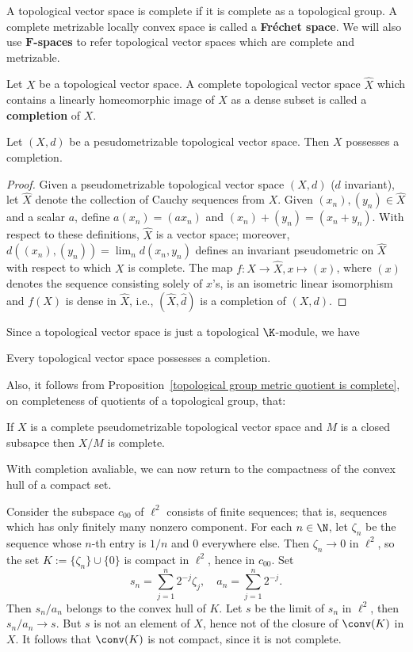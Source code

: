 A topological vector space is complete if it is complete as a topological group. A complete metrizable locally convex space is called a \textbf{Fr\'echet space}. We will also use \textbf{$\bm{F}$-spaces} to refer topological vector spaces which are complete and metrizable.
\begin{definition}
Let $X$ be a topological vector space. A complete topological vector space $\widehat{X}$ which contains a linearly homeomorphic image of $X$ as a dense subset is called a \textbf{completion} of $X$.
\end{definition}
\begin{proposition}
Let $(X,d)$ be a pesudometrizable topological vector space. Then $X$ possesses a completion.
\end{proposition}
\begin{proof}
Given a pseudometrizable topological vector space $(X,d)$ ($d$ invariant), let $\widehat{X}$ denote the collection of Cauchy sequences from $X$. Given $(x_n),(y_n)\in\widehat{X}$ and a scalar $a$, define $a(x_n)=(ax_n)$ and $(x_n)+(y_n)=(x_n+y_n)$. With respect to these definitions, $\widehat{X}$ is a vector space; moreover, $d((x_n),(y_n))=\lim_nd(x_n,y_n)$ defines an invariant pseudometric on $\widehat{X}$ with respect to which $X$ is complete. The map $f:X\to\widehat{X},x\mapsto(x)$, where $(x)$ denotes the sequence consisting solely of $x$'s, is an isometric linear isomorphism and $f(X)$ is dense in $\widehat{X}$, i.e., $(\widehat{X},\hat{d})$ is a completion of $(X,d)$.
\end{proof}
Since a topological vector space is just a topological $\K$-module, we have
\begin{theorem}
Every topological vector space possesses a completion.
\end{theorem}
Also, it follows from Proposition~\ref{topological group metric quotient is complete}, on completeness of quotients of a topological group, that:
\begin{theorem}\label{TVS quotient is complete if}
If $X$ is a complete pseudometrizable topological vector space and $M$ is a closed subsapce then $X/M$ is complete.
\end{theorem}
With completion avaliable, we can now return to the compactness of the convex hull of a compact set.
\begin{example}
Consider the subspace $c_{00}$ of $\ell^2$ consists of finite sequences; that is, sequences which has only finitely many nonzero component. For each $n\in\N$, let $\zeta_n$ be the sequence whose $n$-th entry is $1/n$ and $0$ everywhere else. Then $\zeta_n\to 0$ in $\ell^2$, so the set $K:=\{\zeta_n\}\cup\{0\}$ is compact in $\ell^2$, hence in $c_{00}$. Set
\[s_n=\sum_{j=1}^{n}2^{-j}\zeta_j,\quad a_n=\sum_{j=1}^{n}2^{-j}.\]
Then $s_n/a_n$ belongs to the convex hull of $K$. Let $s$ be the limit of $s_n$ in $\ell^2$, then $s_n/a_n\to s$. But $s$ is not an element of $X$, hence not of the closure of $\conv(K)$ in $X$. It follows that $\conv(K)$ is not compact, since it is not complete.
\end{example}
